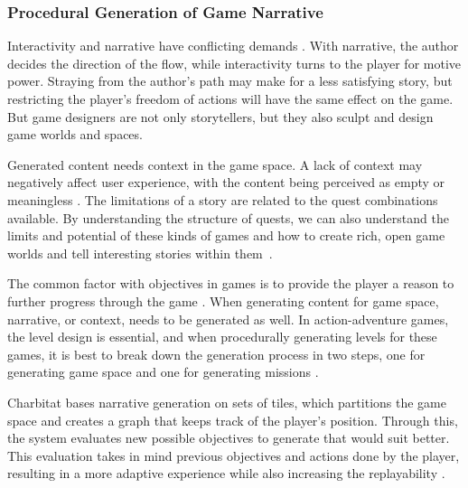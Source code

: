 \subsubsection{Procedural Generation of Game Narrative}
Interactivity and narrative have conflicting demands \cite{p7jenkins2004game}. With narrative, the author decides the direction of the flow, while interactivity turns to the player for motive power. Straying from the author's path may make for a less satisfying story, but restricting the player's freedom of actions will have the same effect on the game. But game designers are not only storytellers, but they also sculpt and design game worlds and spaces.

Generated content needs context in the game space. A lack of context may negatively affect user experience, with the content being perceived as empty or meaningless \cite{p7ashmore2007}. The limitations of a story are related to the quest combinations available. By understanding the structure of quests, we can also understand the limits and potential of these kinds of games and how to create rich, open game worlds and tell interesting stories within them~\cite{p7aarseth2005hunt}.

The common factor with objectives in games is to provide the player a reason to further progress through the game \cite{p7ashmore2007}. When generating content for game space, narrative, or context, needs to be generated as well. In action-adventure games, the level design is essential, and when procedurally generating levels for these games, it is best to break down the generation process in two steps, one for generating game space and one for generating missions \cite{p7dormans2011generating}.

Charbitat bases narrative generation on sets of tiles, which partitions the game space and creates a graph that keeps track of the player's position. Through this, the system evaluates new possible objectives to generate that would suit better. This evaluation takes in mind previous objectives and actions done by the player, resulting in a more adaptive experience while also increasing the replayability \cite{p7ashmore2007}.

